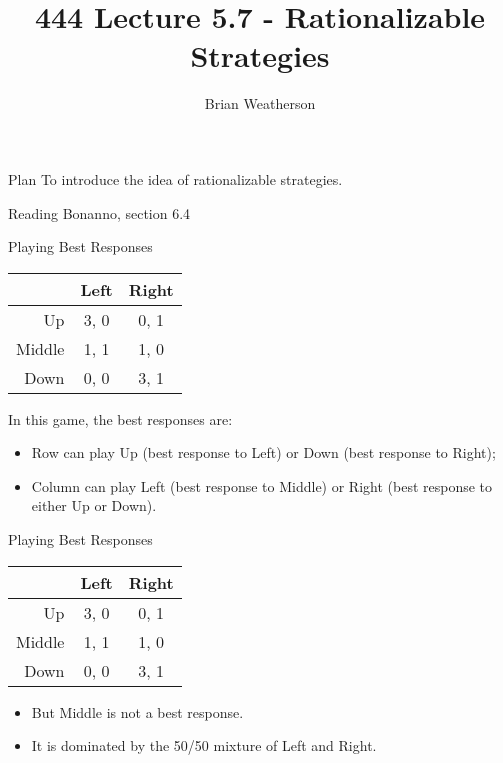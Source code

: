 \documentclass[
  ignorenonframetext,
]{beamer}
\title{444 Lecture 5.7 - Rationalizable Strategies}
\author{Brian Weatherson}
\date{}
\providecommand{\tightlist}{%
  \setlength{\itemsep}{0pt}\setlength{\parskip}{0pt}}
\begin{document}
\frame{\titlepage}

\begin{frame}{Plan}
\protect\hypertarget{plan}{}
To introduce the idea of rationalizable strategies.
\end{frame}

\begin{frame}{Reading}
\protect\hypertarget{reading}{}
Bonanno, section 6.4
\end{frame}

\begin{frame}{Playing Best Responses}
\protect\hypertarget{playing-best-responses}{}
\begin{table}[!h]
\centering
\begin{tabular}[t]{>{}r|cc}
\toprule
 & Left & Right\\
\midrule
Up & 3, 0 & 0, 1\\
Middle & 1, 1 & 1, 0\\
Down & 0, 0 & 3, 1\\
\bottomrule
\end{tabular}
\end{table}

In this game, the best responses are:

\begin{itemize}
\tightlist
\item
  Row can play Up (best response to Left) or Down (best response to
  Right);
\item
  Column can play Left (best response to Middle) or Right (best response
  to either Up or Down).
\end{itemize}
\end{frame}

\begin{frame}{Playing Best Responses}
\protect\hypertarget{playing-best-responses-1}{}
\begin{table}[!h]
\centering
\begin{tabular}[t]{>{}r|cc}
\toprule
 & Left & Right\\
\midrule
Up & 3, 0 & 0, 1\\
Middle & 1, 1 & 1, 0\\
Down & 0, 0 & 3, 1\\
\bottomrule
\end{tabular}
\end{table}

\begin{itemize}
\tightlist
\item
  But Middle is not a best response.
\item
  It is dominated by the 50/50 mixture of Left and Right.
\end{itemize}
\end{frame}
\end{document}
